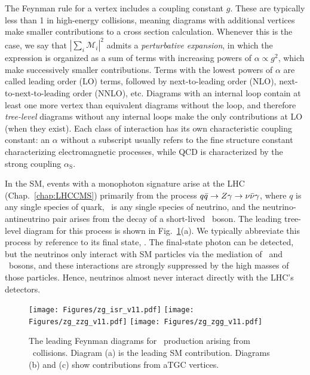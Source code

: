 The Feynman rule for a vertex includes a coupling constant $g$. These are typically less than 1 in high-energy collisions, meaning diagrams
with additional vertices make smaller contributions to a cross section calculation. Whenever this is the case, we say that
$|\sum_{i}{\mathcal{M}_{i}}|^{2}$ admits a \textit{perturbative expansion}, in which the expression is organized as a sum of terms with increasing powers
of $\alpha \propto g^{2}$, which make successively smaller contributions.
Terms with the lowest powers of $\alpha$ are called leading order (LO) terms, followed by next-to-leading order (NLO), next-to-next-to-leading order (NNLO), etc.
Diagrams with an internal loop contain at least one more vertex than equivalent diagrams without the loop, and therefore \textit{tree-level} diagrams without any internal loops
make the only contributions at LO (when they exist). Each class of interaction has its own characteristic coupling constant:
an $\alpha$ without a subscript usually refers to the fine structure constant characterizing electromagnetic processes, while QCD is characterized by the strong coupling $\alpha_\mathrm{S}$.

In the SM, events with a monophoton signature arise at the LHC (Chap.~\ref{chap:LHCCMS}) primarily from the process $q\bar{q} \to Z\gamma \to \nu\bar{\nu}\gamma$,
where $q$ is any single species of quark, \Pn\ is any single species of neutrino, and the neutrino-antineutrino pair arises from the decay
of a short-lived \PZ\ boson. The leading tree-level diagram for this process is shown in Fig.~\ref{fig:zinvg_diagrams}(a). We typically abbreviate this process by
reference to its final state, \zinvg. The final-state photon can be detected, but the neutrinos only interact with SM particles via the mediation
of \PZ\ and \PW\ bosons, and these interactions are strongly suppressed by the high masses of those particles. Hence, neutrinos almost never interact directly with the LHC's detectors.

\begin{figure}[htb]
  \begin{center}
    \texttt{[image: Figures/zg\_isr\_v11.pdf]}
    \texttt{[image: Figures/zg\_zzg\_v11.pdf]}
    \texttt{[image: Figures/zg\_zgg\_v11.pdf]}
    \caption{
      The leading Feynman diagrams for \zinvg\ production arising from \Pp\Pp\ collisions. Diagram (a) is the leading SM contribution.
      Diagrams (b) and (c) show contributions from aTGC vertices.
    }
    \label{fig:zinvg_diagrams}
  \end{center}
\end{figure}

